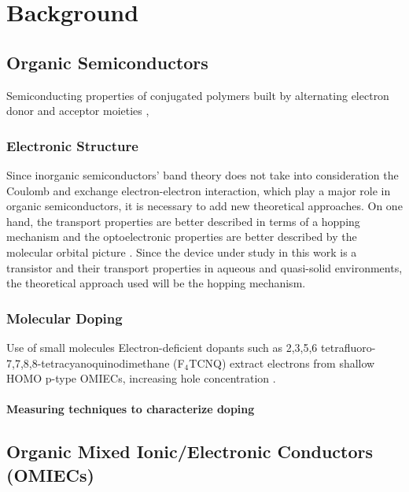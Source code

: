 {\chapter{Background}}
\label{sec:background}

\section{Organic Semiconductors}

Semiconducting properties of conjugated polymers built by alternating electron donor and acceptor moieties \cite{mattinenAtomicLayerDeposition2021}, 


\subsection{Electronic Structure}

Since inorganic semiconductors' band theory does not take into consideration the Coulomb and exchange electron-electron interaction, which play a major role in organic semiconductors, it is necessary to add new theoretical approaches. On one hand, the transport properties are better described in terms of a hopping mechanism and the optoelectronic properties are better described by the molecular orbital picture \cite{alcacerElectronicStructureOrganic2018}. Since the device under study in this work is a transistor and their transport properties in aqueous and quasi-solid environments, the theoretical approach used will be the hopping mechanism.

\subsection{Molecular Doping}

Use of small molecules
Electron-deficient dopants such as 2,3,5,6 tetrafluoro-7,7,8,8-tetracyanoquinodimethane (F$_{4}$TCNQ) extract electrons from shallow HOMO p-type OMIECs, increasing hole concentration \cite{tanOrganicMixedIonic2022}.

\subsubsection{Measuring techniques to characterize doping}

\section{Organic Mixed Ionic/Electronic Conductors (OMIECs)}

